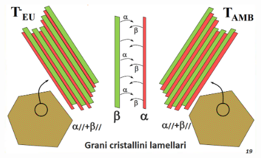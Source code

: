 \documentclass{article}
\begin{document}
{            \begin{figure}[h!]
                \centering
                \includegraphics[width=.85\linewidth]{Diagramma di smiscelamento tra fasi parzialmente miscibili.png}
            \end{figure}
}
\end{document}
